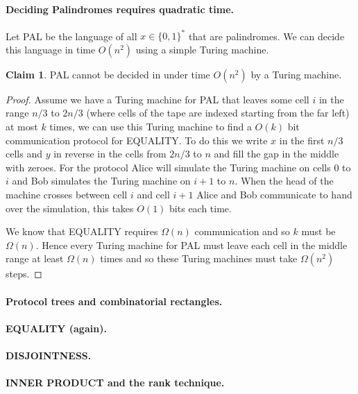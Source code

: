 \documentclass[11pt,a4paper]{article}
\theoremstyle{definition}
\newtheorem{claim}{Claim}
\begin{document}
\paragraph{Deciding Palindromes requires quadratic time.}
Let PAL be the language of all $x\in \{0,1\}^*$ that are palindromes.
We can decide this language in time $O(n^2)$ using a simple Turing machine.
\begin{claim}
PAL cannot be decided in under time $O(n^2)$ by a Turing machine.
\end{claim}
\begin{proof}
Assume we have a Turing machine for PAL that leaves some cell $i$ in the range $n/3$ to $2n/3$ (where cells of the tape are indexed starting from the far left) at most $k$ times, we can use this Turing machine to find a $O(k)$ bit communication protocol for EQUALITY.
To do this we write $x$ in the first $n/3$ cells and $y$ in reverse in the cells from $2n/3$ to $n$ and fill the gap in the middle with zeroes.
For the protocol Alice will simulate the Turing machine on cells $0$ to $i$ and Bob simulates the Turing machine on $i+1$ to $n$.
When the head of the machine crosses between cell $i$ and cell $i+1$ Alice and Bob communicate to hand over the simulation, this takes $O(1)$ bits each time.

We know that EQUALITY requires $\Omega(n)$ communication and so $k$ must be $\Omega(n)$.
Hence every Turing machine for PAL must leave each cell in the middle range at least $\Omega(n)$ times and so these Turing machines must take $\Omega(n^2)$ steps.
\end{proof}

\paragraph{Protocol trees and combinatorial rectangles.}

\paragraph{EQUALITY (again).}

\paragraph{DISJOINTNESS.}

\paragraph{INNER PRODUCT and the rank technique.}
\end{document}
